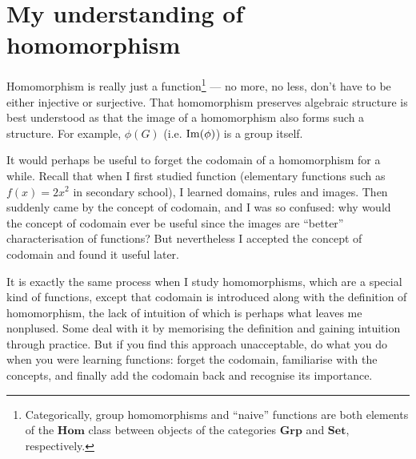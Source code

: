 \documentclass[a4paper]{article}
\begin{document}
\appendix

\section{My understanding of homomorphism}
\label{sec:homomorphism}

Homomorphism is really just a function\footnote{Categorically, group homomorphisms and ``naive'' functions are both elements of the $\mathbf{Hom}$ class between objects of the categories $\mathbf{Grp}$ and $\mathbf{Set}$, respectively.} --- no more, no less, don't have to be either injective or surjective. That homomorphism preserves algebraic structure is best understood as that the image of a homomorphism also forms such a structure. For example, $\phi(G)$ (i.e. $\operatorname{Im}(\phi)$) is a group itself.

It would perhaps be useful to forget the codomain of a homomorphism for a while. Recall that when I first studied function (elementary functions such as $f(x) = 2x^2$ in secondary school), I learned domains, rules and images. Then suddenly came by the concept of codomain, and I was so confused: why would the concept of codomain ever be useful since the images are “better” characterisation of functions? But nevertheless I accepted the concept of codomain and found it useful later. 

It is exactly the same process when I study homomorphisms, which are a special kind of functions, except that codomain is introduced along with the definition of homomorphism, the lack of intuition of which is perhaps what leaves me nonplused. Some deal with it by memorising the definition and gaining intuition through practice. But if you find this approach unacceptable, do what you do when you were learning functions: forget the codomain, familiarise with the concepts, and finally add the codomain back and recognise its importance.
\end{document}
